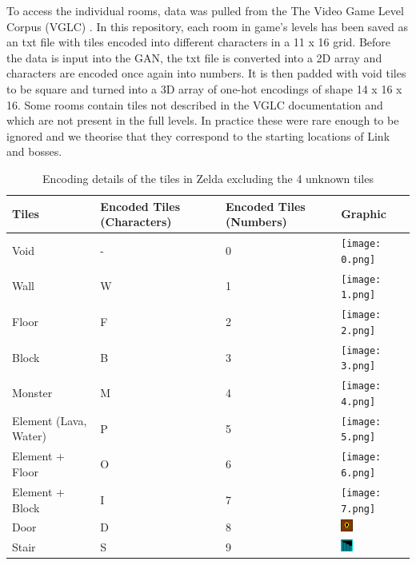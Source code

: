 \documentclass{article}
\begin{document}
To access the individual rooms, data was pulled from the The Video Game Level Corpus (VGLC) \cite{schrum2020}. In this repository, each room in game's levels has been saved as an txt file with tiles encoded into different characters in a 11 x 16 grid. Before the data is input into the GAN, the txt file is converted into a 2D array and characters are encoded once again into numbers. It is then padded with void tiles to be square and turned into a 3D array of one-hot encodings of shape 14 x 16 x 16. Some rooms contain tiles not described in the VGLC documentation and which are not present in the full levels. In practice these were rare enough to be ignored and we theorise that they correspond to the starting locations of Link and bosses.

 

\begin{table}
\begin{center}
    \begin{tabularx}{\columnwidth}{Y|Y|Y|Y}
         \hline
         Tiles & Encoded Tiles (Characters) & Encoded Tiles (Numbers) & Graphic \\ \hline
         Void & - & 0 & \texttt{[image: 0.png]}\\
         Wall & W & 1 & \texttt{[image: 1.png]}\\
         Floor & F & 2 & \texttt{[image: 2.png]}\\
         Block & B & 3 & \texttt{[image: 3.png]}\\
         Monster & M & 4 & \texttt{[image: 4.png]}\\
         Element (Lava, Water) & P & 5 & \texttt{[image: 5.png]}\\
         Element + Floor & O & 6 & \texttt{[image: 6.png]}\\
         Element + Block & I & 7 & \texttt{[image: 7.png]}\\
         Door & D & 8 & \includegraphics{8.png}\\
         Stair & S & 9 & \includegraphics{9.png}\\
         \hline
    \end{tabularx}
\end{center}
\caption{Encoding details of the tiles in Zelda excluding the 4 unknown tiles}
\label{table:tiles}
\end{table}
\end{document}
